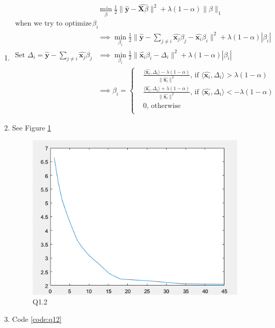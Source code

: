 \documentclass[11pt]{article}
\newcommand{\mtx}[1]{\mathbf{#1}}
\newcommand{\vct}[1]{\mathbf{#1}}
\def \mX {\mtx{X}}
\def \vx {\vct{x}}
\def \vy {\vct{y}}
\begin{document}
\begin{enumerate}
\begin{enumerate}
		\item \begin{align*}
			&\min_{\beta} \frac{1}{2} \|\hat{\vy}-\hat{\mX\beta}\|^2+\lambda(1-\alpha)\|\beta\|_1\\
			\text{when we try to optimize } \beta_i\\ 
			&\implies  \min_{\beta_i} \frac{1}{2}\|\hat{\vy}- \sum_{j\neq i}\hat{\vx_j}\beta_j-\hat{\vx_i}\beta_i\|^2+\lambda(1-\alpha)|\beta_i|\\
			\text{Set } \Delta_i = \hat{\vy}- \sum_{j\neq i}\hat{\vx_j}\beta_j 
			&\implies  \min_{\beta_i} \frac{1}{2}\|\hat{\vx_i}\beta_i-\Delta_i\|^2+\lambda(1-\alpha)|\beta_i|\\
			&\implies \beta_i = 
			\left\{ \begin{aligned} 
				&\frac{\langle\hat{\vx_i},\Delta_i\rangle-\lambda(1-\alpha)}{\|\hat{\vx_i}\|^2}\text{, if } \langle\hat{\vx_i},\Delta_i\rangle>\lambda(1-\alpha)\\
				&\frac{\langle\hat{\vx_i},\Delta_i\rangle+\lambda(1-\alpha)}{\|\hat{\vx_i}\|^2}\text{, if } \langle\hat{\vx_i},\Delta_i\rangle<-\lambda(1-\alpha)\\
				&0 \text{, otherwise}\\ 
			\end{aligned} \right.
		\end{align*}
		\item See Figure \ref{fig:Q1_2}
		\begin{figure}[h!]
			\centering
			\includegraphics[width=0.5\linewidth]{Q1_2.png}
			\caption{Q1.2}
			\label{fig:Q1_2}
		\end{figure}
		\item Code \ref{code:q12}
		
	\end{enumerate}
\end{enumerate}
	

\newpage
\end{document}
